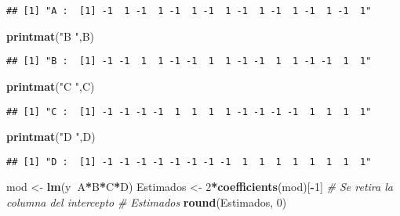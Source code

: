 \documentclass[]{article}
\newenvironment{Shaded}{\begin{snugshade}}{\end{snugshade}}
\newcommand{\CommentTok}[1]{\textcolor[rgb]{0.56,0.35,0.01}{\textit{#1}}}
\newcommand{\DecValTok}[1]{\textcolor[rgb]{0.00,0.00,0.81}{#1}}
\newcommand{\KeywordTok}[1]{\textcolor[rgb]{0.13,0.29,0.53}{\textbf{#1}}}
\newcommand{\NormalTok}[1]{#1}
\newcommand{\OperatorTok}[1]{\textcolor[rgb]{0.81,0.36,0.00}{\textbf{#1}}}
\newcommand{\StringTok}[1]{\textcolor[rgb]{0.31,0.60,0.02}{#1}}
\begin{document}
\begin{verbatim}
## [1] "A :  [1] -1  1 -1  1 -1  1 -1  1 -1  1 -1  1 -1  1 -1  1"
\end{verbatim}

\begin{Shaded}
\begin{Highlighting}[]
\KeywordTok{printmat}\NormalTok{(}\StringTok{"B "}\NormalTok{,B)}
\end{Highlighting}
\end{Shaded}

\begin{verbatim}
## [1] "B :  [1] -1 -1  1  1 -1 -1  1  1 -1 -1  1  1 -1 -1  1  1"
\end{verbatim}

\begin{Shaded}
\begin{Highlighting}[]
\KeywordTok{printmat}\NormalTok{(}\StringTok{"C "}\NormalTok{,C)}
\end{Highlighting}
\end{Shaded}

\begin{verbatim}
## [1] "C :  [1] -1 -1 -1 -1  1  1  1  1 -1 -1 -1 -1  1  1  1  1"
\end{verbatim}

\begin{Shaded}
\begin{Highlighting}[]
\KeywordTok{printmat}\NormalTok{(}\StringTok{"D "}\NormalTok{,D)}
\end{Highlighting}
\end{Shaded}

\begin{verbatim}
## [1] "D :  [1] -1 -1 -1 -1 -1 -1 -1 -1  1  1  1  1  1  1  1  1"
\end{verbatim}

\begin{Shaded}
\begin{Highlighting}[]
\NormalTok{mod <-}\StringTok{ }\KeywordTok{lm}\NormalTok{(y}\OperatorTok{~}\NormalTok{A}\OperatorTok{*}\NormalTok{B}\OperatorTok{*}\NormalTok{C}\OperatorTok{*}\NormalTok{D)}
\NormalTok{Estimados <-}\StringTok{ }\DecValTok{2}\OperatorTok{*}\KeywordTok{coefficients}\NormalTok{(mod)[}\OperatorTok{-}\DecValTok{1}\NormalTok{]  }\CommentTok{# Se retira la columna del intercepto}
\CommentTok{# Estimados}
\KeywordTok{round}\NormalTok{(Estimados, }\DecValTok{0}\NormalTok{)}
\end{Highlighting}
\end{Shaded}
\end{document}
